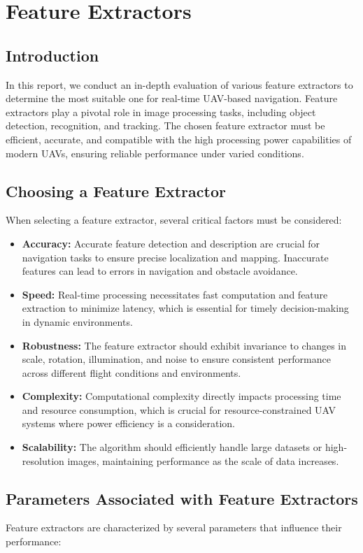 \chapter{Feature Extractors}
\section{Introduction}
In this report, we conduct an in-depth evaluation of various feature extractors to determine the most suitable one for real-time UAV-based navigation. Feature extractors play a pivotal role in image processing tasks, including object detection, recognition, and tracking. The chosen feature extractor must be efficient, accurate, and compatible with the high processing power capabilities of modern UAVs, ensuring reliable performance under varied conditions.

\section{Choosing a Feature Extractor}
When selecting a feature extractor, several critical factors must be considered:
\begin{itemize}
    \item \textbf{Accuracy:} Accurate feature detection and description are crucial for navigation tasks to ensure precise localization and mapping. Inaccurate features can lead to errors in navigation and obstacle avoidance.
    \item \textbf{Speed:} Real-time processing necessitates fast computation and feature extraction to minimize latency, which is essential for timely decision-making in dynamic environments.
    \item \textbf{Robustness:} The feature extractor should exhibit invariance to changes in scale, rotation, illumination, and noise to ensure consistent performance across different flight conditions and environments.
    \item \textbf{Complexity:} Computational complexity directly impacts processing time and resource consumption, which is crucial for resource-constrained UAV systems where power efficiency is a consideration.
    \item \textbf{Scalability:} The algorithm should efficiently handle large datasets or high-resolution images, maintaining performance as the scale of data increases.
\end{itemize}

\section{Parameters Associated with Feature Extractors}
Feature extractors are characterized by several parameters that influence their performance:


